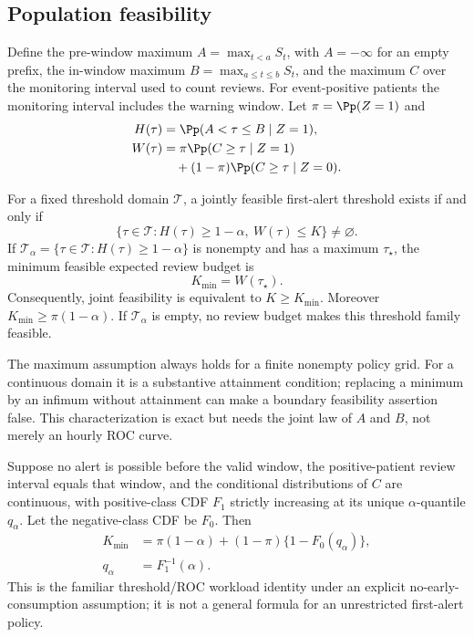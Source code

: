 \subsection{Population feasibility}
Define the pre-window maximum $A=\max_{t<a}S_t$, with $A=-\infty$ for an empty prefix, the in-window maximum $B=\max_{a\le t\le b}S_t$, and the maximum $C$ over the monitoring interval used to count reviews. For event-positive patients the monitoring interval includes the warning window. Let $\pi=\Pp(Z=1)$ and
\begin{equation}
 \begin{aligned}
 H(\tau)&=\Pp(A<\tau\le B\mid Z=1),\\
 W(\tau)&=\pi\Pp(C\ge\tau\mid Z=1)\\
 &\quad +(1-\pi)\Pp(C\ge\tau\mid Z=0).
 \end{aligned}
 \label{eq:HW}
\end{equation}

\begin{theorem}\label{thm:feas}
For a fixed threshold domain $\mathcal T$, a jointly feasible first-alert threshold exists if and only if
\[
 \{\tau\in\mathcal T:H(\tau)\ge 1-\alpha,\ W(\tau)\le K\}\ne\varnothing.
\]
If $\mathcal T_\alpha=\{\tau\in\mathcal T:H(\tau)\ge1-\alpha\}$ is nonempty and has a maximum $\tau_\star$, the minimum feasible expected review budget is
\begin{equation}
 K_{\min}=W(\tau_\star).
 \label{eq:kmin}
\end{equation}
Consequently, joint feasibility is equivalent to $K\ge K_{\min}$. Moreover $K_{\min}\ge\pi(1-\alpha)$. If $\mathcal T_\alpha$ is empty, no review budget makes this threshold family feasible.
\end{theorem}
The maximum assumption always holds for a finite nonempty policy grid. For a continuous domain it is a substantive attainment condition; replacing a minimum by an infimum without attainment can make a boundary feasibility assertion false. This characterization is exact but needs the joint law of $A$ and $B$, not merely an hourly ROC curve.

\begin{corollary}\label{cor:quantile}
Suppose no alert is possible before the valid window, the positive-patient review interval equals that window, and the conditional distributions of $C$ are continuous, with positive-class CDF $F_1$ strictly increasing at its unique $\alpha$-quantile $q_\alpha$. Let the negative-class CDF be $F_0$. Then
\begin{equation}
 \begin{aligned}
 K_{\min}&=\pi(1-\alpha)+(1-\pi)\{1-F_0(q_\alpha)\},\\
 q_\alpha&=F_1^{-1}(\alpha).
 \end{aligned}
\end{equation}
This is the familiar threshold/ROC workload identity under an explicit no-early-consumption assumption; it is not a general formula for an unrestricted first-alert policy.
\end{corollary}

